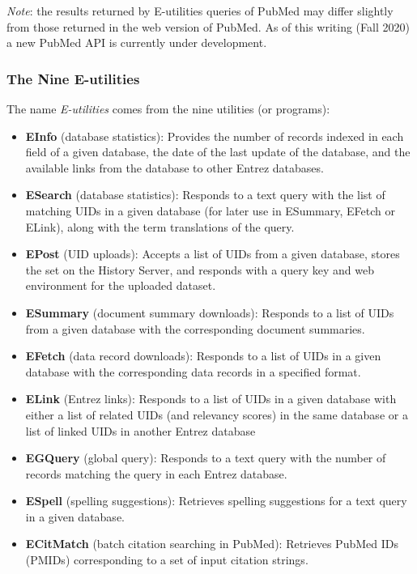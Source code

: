 \documentclass[
]{book}
\begin{document}
\emph{Note}: the results returned by E-utilities queries of PubMed may differ
slightly from those returned in the web version of PubMed. As of this writing
(Fall 2020) a new PubMed API is currently under development.

\hypertarget{the-nine-e-utilities}{%
\subsubsection*{The Nine E-utilities}\label{the-nine-e-utilities}}

The name \emph{E-utilities} comes from the nine utilities (or programs):

\begin{itemize}
\item
  \textbf{EInfo} (database statistics): Provides the number of records indexed in each field of a given database, the date of the last update of the database, and the available links from the database to other Entrez databases.
\item
  \textbf{ESearch} (database statistics): Responds to a text query with the list of matching UIDs in a given database (for later use in ESummary, EFetch or ELink), along with the term translations of the query.
\item
  \textbf{EPost} (UID uploads): Accepts a list of UIDs from a given database, stores the set on the History Server, and responds with a query key and web environment for the uploaded dataset.
\item
  \textbf{ESummary} (document summary downloads): Responds to a list of UIDs from a given database with the corresponding document summaries.
\item
  \textbf{EFetch} (data record downloads): Responds to a list of UIDs in a given database with the corresponding data records in a specified format.
\item
  \textbf{ELink} (Entrez links): Responds to a list of UIDs in a given database with either a list of related UIDs (and relevancy scores) in the same database or a list of linked UIDs in another Entrez database
\item
  \textbf{EGQuery} (global query): Responds to a text query with the number of records matching the query in each Entrez database.
\item
  \textbf{ESpell} (spelling suggestions): Retrieves spelling suggestions for a text query in a given database.
\item
  \textbf{ECitMatch} (batch citation searching in PubMed): Retrieves PubMed IDs (PMIDs) corresponding to a set of input citation strings.
\end{itemize}
\end{document}

